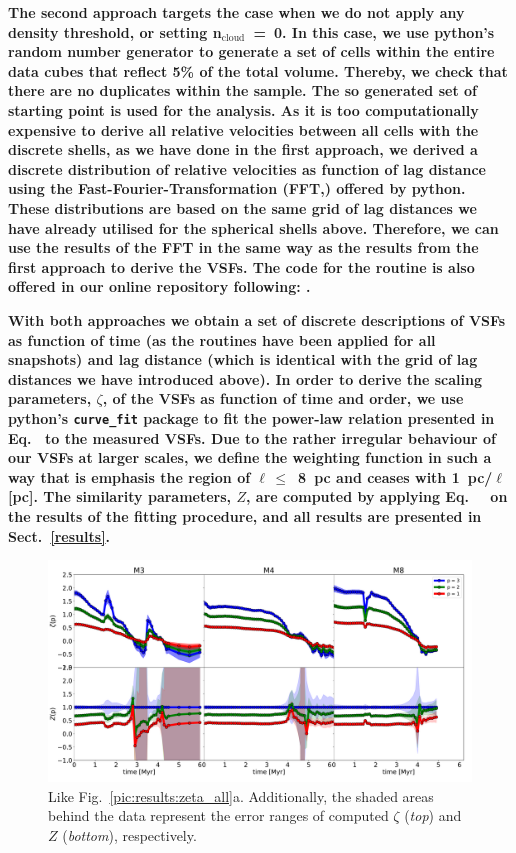 \textbf{
    The second approach targets the case when we do not apply any density threshold, or setting n$_\mathrm{cloud}$~=~0.
    In this case, we use python's random number generator  to generate a set of cells within the entire data cubes that reflect 5\% of the total volume. 
    Thereby, we check that there are no duplicates within the sample.
    The so generated set of starting point is used for the analysis.
    As it is too computationally expensive to derive all relative velocities between all cells with the discrete shells, as we have done in the first approach, we derived a discrete distribution of relative velocities as function of lag distance using the Fast-Fourier-Transformation (FFT,) offered by python.
    These distributions are based on the same grid of lag distances we have already utilised for the spherical shells above.
    Therefore, we can use the results of the FFT in the same way as the results from the first approach to derive the VSFs.
    The code for the routine is also offered in our online repository following: .
}

\textbf{
    With both approaches we obtain a set of discrete descriptions of VSFs as function of time (as the routines have been applied for all snapshots) and lag distance (which is identical with the grid of lag distances we have introduced above).
    In order to derive the scaling parameters, $\zeta$, of the VSFs as function of time and order, we use python's \texttt{curve_fit} package to fit the power-law relation presented in Eq.~ to the measured VSFs.
    Due to the rather irregular behaviour of our VSFs at larger scales, we define the weighting function in such a way that is emphasis the region of $\ell\,\leq$~8~pc and ceases with 1~pc/$\ell$[pc]. 
    The similarity parameters, $Z$, are computed by applying Eq.~~ on the results of the fitting procedure, and all results are presented in Sect.~\ref{results}.
}

\begin{figure}
    \centering
    \includegraphics[width=\textwidth]{error_vsf04_zeta_z.pdf}
    \caption{
        Like Fig.~\ref{pic:results:zeta_all}a.
        Additionally, the shaded areas behind the data represent the error ranges of computed $\zeta$ (\textit{top}) and $Z$ (\textit{bottom}), respectively. 
    }
    \label{pic:appFitting:error_vsfhr04_zeta_z}
\end{figure}

